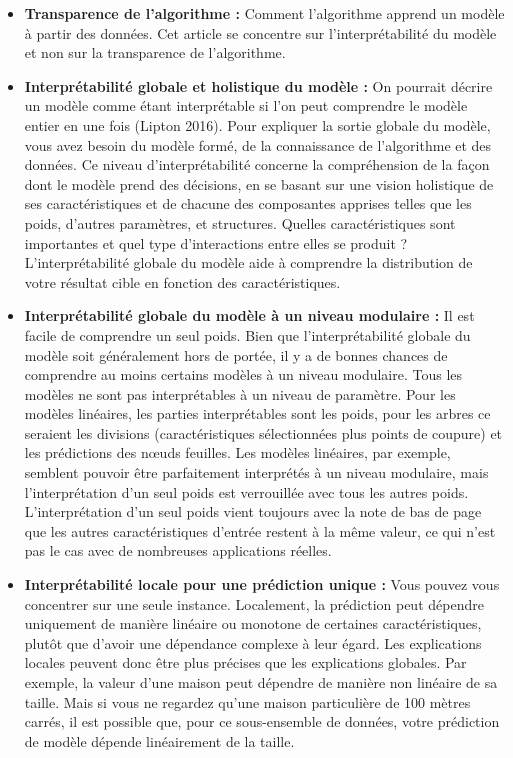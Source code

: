\begin{itemize}
    
    \item \textbf{Transparence de l'algorithme :} Comment l'algorithme apprend un modèle à partir des données. Cet article se concentre sur l'interprétabilité du modèle et non sur la transparence de l'algorithme.
    
    \item \textbf{Interprétabilité globale et holistique du modèle :} On pourrait décrire un modèle comme étant interprétable si l'on peut comprendre le modèle entier en une fois (Lipton 2016). Pour expliquer la sortie globale du modèle, vous avez besoin du modèle formé, de la connaissance de l'algorithme et des données. Ce niveau d'interprétabilité concerne la compréhension de la façon dont le modèle prend des décisions, en se basant sur une vision holistique de ses caractéristiques et de chacune des composantes apprises telles que les poids, d'autres paramètres, et structures. Quelles caractéristiques sont importantes et quel type d'interactions entre elles se produit ? L'interprétabilité globale du modèle aide à comprendre la distribution de votre résultat cible en fonction des caractéristiques.
    
    \item \textbf{Interprétabilité globale du modèle à un niveau modulaire :} Il est facile de comprendre un seul poids. Bien que l'interprétabilité globale du modèle soit généralement hors de portée, il y a de bonnes chances de comprendre au moins certains modèles à un niveau modulaire. Tous les modèles ne sont pas interprétables à un niveau de paramètre. Pour les modèles linéaires, les parties interprétables sont les poids, pour les arbres ce seraient les divisions (caractéristiques sélectionnées plus points de coupure) et les prédictions des nœuds feuilles. Les modèles linéaires, par exemple, semblent pouvoir être parfaitement interprétés à un niveau modulaire, mais l'interprétation d'un seul poids est verrouillée avec tous les autres poids. L'interprétation d'un seul poids vient toujours avec la note de bas de page que les autres caractéristiques d'entrée restent à la même valeur, ce qui n'est pas le cas avec de nombreuses applications réelles.
    
    \item \textbf{Interprétabilité locale pour une prédiction unique :} Vous pouvez vous concentrer sur une seule instance. Localement, la prédiction peut dépendre uniquement de manière linéaire ou monotone de certaines caractéristiques, plutôt que d'avoir une dépendance complexe à leur égard. Les explications locales peuvent donc être plus précises que les explications globales. Par exemple, la valeur d'une maison peut dépendre de manière non linéaire de sa taille. Mais si vous ne regardez qu'une maison particulière de 100 mètres carrés, il est possible que, pour ce sous-ensemble de données, votre prédiction de modèle dépende linéairement de la taille.
    

\end{itemize}
